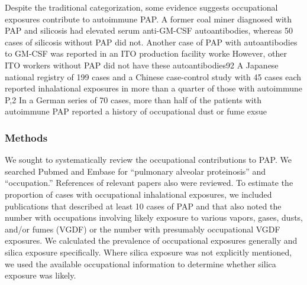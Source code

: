\documentclass[a4
er,12pt]{article}
\begin{document}
Despite the traditional categorization, some evidence suggests occupational exposures contribute to autoimmune PAP.  A former coal miner diagnosed with PAP and silicosis had elevated serum anti-GM-CSF autoantibodies, whereas 50 cases of silicosis without PAP did not.  Another case of PAP with autoantibodies to GM-CSF was reported in an ITO production facility worke  However, other ITO workers without PAP did not have these autoantibodies92  A Japanese national registry of 199
cases and a Chinese case-control study with 45 cases each reported inhalational exposures in more than a quarter of those with autoimmune P,2  In a German series of 70 cases, more than half of the patients with autoimmune PAP reported a history of occupational dust or fume exsue  

\subsubsection{Methods}
We sought to systematically review the occupational contributions to PAP.  We searched Pubmed and Embase for “pulmonary alveolar proteinosis” and “occupation.”  References of relevant papers also were reviewed.  To estimate the proportion of cases with occupational inhalational exposures, we included publications that described at least 10 cases of PAP and that also noted the number with occupations involving likely exposure to various vapors, gases, dusts, and/or fumes (VGDF) or the
number with presumably occupational VGDF exposures.  We calculated the prevalence of occupational exposures generally and silica exposure specifically.  Where silica exposure was not explicitly mentioned, we used the available occupational information to determine whether silica exposure was likely.  
\end{document}
